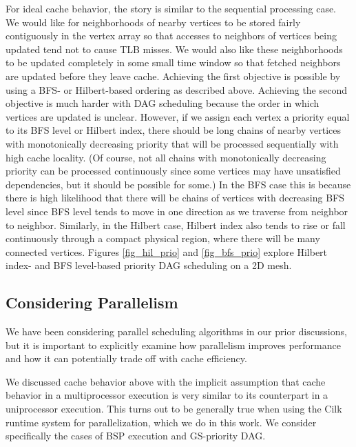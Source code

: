 \documentclass[journal]{IEEEtran}
\begin{document}
For ideal cache behavior, the story is similar to the sequential processing case. We would like for neighborhoods of nearby vertices to be stored fairly contiguously in the vertex array so that accesses to neighbors of vertices being updated tend not to cause TLB misses. We would also like these neighborhoods to be updated completely in some small time window so that fetched neighbors are updated before they leave cache. Achieving the first objective is possible by using a BFS- or Hilbert-based ordering as described above. Achieving the second objective is much harder with DAG scheduling because the order in which vertices are updated is unclear. However, if we assign each vertex a priority equal to its BFS level or Hilbert index, there should be long chains of nearby vertices with monotonically decreasing priority that will be processed sequentially with high cache locality. (Of course, not all chains with monotonically decreasing priority can be processed continuously since some vertices may have unsatisfied dependencies, but it should be possible for some.) In the BFS case this is because there is high likelihood that there will be chains of vertices with decreasing BFS level since BFS level tends to move in one direction as we traverse from neighbor to neighbor. Similarly, in the Hilbert case, Hilbert index also tends to rise or fall continuously through a compact physical region, where there will be many connected vertices. Figures \ref{fig_hil_prio} and \ref{fig_bfs_prio} explore Hilbert index- and BFS level-based priority DAG scheduling on a 2D mesh.


\subsection{Considering Parallelism}
We have been considering parallel scheduling algorithms in our prior discussions, but it is important to explicitly examine how parallelism improves performance and how it can potentially trade off with cache efficiency.

We discussed cache behavior above with the implicit assumption that cache behavior in a multiprocessor execution is very similar to its counterpart in a uniprocessor execution. This turns out to be generally true when using the Cilk runtime system \cite{cilk} for parallelization, which we do in this work. We consider specifically the cases of BSP execution and GS-priority DAG.
\end{document}
